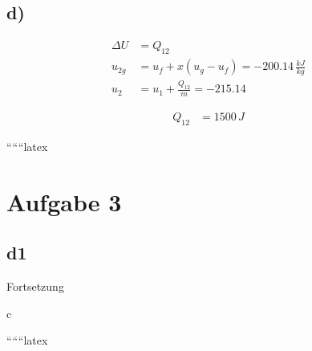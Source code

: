 

\subsection*{d)}
\begin{align*}
    \Delta U &= Q_{12} \\
    u_{2g} &= u_{f} + x (u_{g} - u_{f}) = -200.14 \, \frac{kJ}{kg} \\
    u_2 &= u_1 + \frac{Q_{12}}{m} = -215.14
\end{align*}

\begin{align*}
    Q_{12} &= 1500 \, J
\end{align*}

``````latex


\section*{Aufgabe 3}

\subsection*{d1}
Fortsetzung

c

``````latex